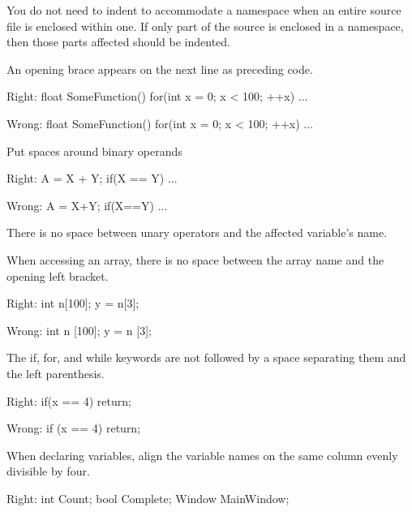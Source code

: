 \item
You do not need to indent to accommodate a namespace when an entire source file is enclosed within one. If only part of the source is enclosed in a namespace, then those parts affected should be indented.

\item
An opening brace appears on the next line as preceding code.

Right:
\startCodeExample
\starttyping
float SomeFunction()
{
    for(int x = 0; x < 100; ++x)
    {
        ...
    }
}
\stoptyping
\stopCodeExample

Wrong:
\startCodeExample
\starttyping
float SomeFunction() {
    for(int x = 0; x < 100; ++x) {
        ...
    }
}
\stoptyping
\stopCodeExample

\item
Put spaces around binary operands

Right:
\startCodeExample
\starttyping
A = X + Y;
if(X == Y)
    ...
\stoptyping
\stopCodeExample

Wrong:
\startCodeExample
\starttyping
A = X+Y;
if(X==Y)
    ...
\stoptyping
\stopCodeExample

\item
There is no space between unary operators and the affected variable's name.

\item
When accessing an array, there is no space between the array name and the opening left bracket. 

Right:
\startCodeExample
\starttyping
int n[100];
y = n[3];
\stoptyping
\stopCodeExample

Wrong:
\startCodeExample
\starttyping
int n [100];
y = n [3];
\stoptyping
\stopCodeExample

\item
The if, for, and while keywords are not followed by a space separating them and the left parenthesis. 

Right:
\startCodeExample
\starttyping
if(x == 4)
    return;
\stoptyping
\stopCodeExample

Wrong:
\startCodeExample
\starttyping
if (x == 4)
    return;
\stoptyping
\stopCodeExample

\item
When declaring variables, align the variable names on the same column evenly divisible by four.

Right:
\startCodeExample
\starttyping
int     Count;
bool    Complete;
Window  MainWindow;
\stoptyping
\stopCodeExample

